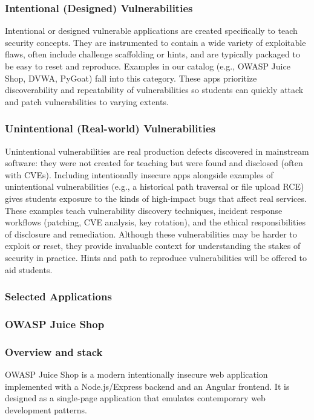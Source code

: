 \documentclass[12pt]{article}
\begin{document}
\subsubsection*{Intentional (Designed) Vulnerabilities}
Intentional or designed vulnerable applications are created specifically to teach security concepts. They are instrumented to contain a wide variety of exploitable flaws, often include challenge scaffolding or hints, and are typically packaged to be easy to reset and reproduce. Examples in our catalog (e.g., OWASP Juice Shop, DVWA, PyGoat) fall into this category. These apps prioritize discoverability and repeatability of vulnerabilities so students can quickly attack and patch vulnerabilities to varying extents.

\subsubsection*{Unintentional (Real-world) Vulnerabilities}
Unintentional vulnerabilities are real production defects discovered in mainstream software: they were not created for teaching but were found and disclosed (often with CVEs). Including intentionally insecure apps alongside examples of unintentional vulnerabilities (e.g., a historical path traversal or file upload RCE) gives students exposure to the kinds of high-impact bugs that affect real services. These examples teach vulnerability discovery techniques, incident response workflows (patching, CVE analysis, key rotation), and the ethical responsibilities of disclosure and remediation. Although these vulnerabilities may be harder to exploit or reset, they provide invaluable context for understanding the stakes of security in practice. Hints and path to reproduce vulnerabilities will be offered to aid students.

\subsubsection{Selected Applications}

\subsubsection{OWASP Juice Shop}

\subsubsection*{Overview and stack}
OWASP Juice Shop is a modern intentionally insecure web application implemented with a Node.js/Express backend and an Angular frontend. It is designed as a single-page application that emulates contemporary web development patterns.
\end{document}

